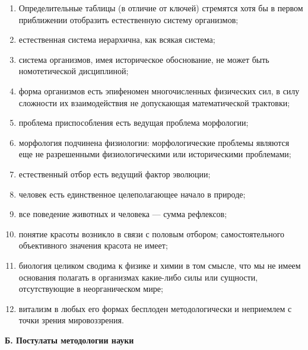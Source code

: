 \begin{enumerate}

  \item Определительные таблицы (в отличие от ключей) стремятся хотя
        бы в первом приближении отобразить естественную систему
        организмов;

  \item естественная система иерархична, как всякая система;

  \item система организмов, имея историческое обоснование, не может
        быть номотетической дисциплиной;

  \item форма организмов есть эпифеномен многочисленных физических
        сил, в силу сложности их взаимодействия не допускающая
        математической трактовки;

  \item проблема приспособления есть ведущая проблема морфологии;

  \item морфология подчинена физиологии: морфологические проблемы
        являются еще не разрешенными физиологическими или
        историческими проблемами;

  \item естественный отбор есть ведущий фактор эволюции;

  \item человек есть единственное целеполагающее начало в природе;

  \item все поведение животных и человека --- сумма рефлексов;

  \item понятие красоты возникло в связи с половым отбором;
        самостоятельного объективного значения красота не имеет;

  \item биология целиком сводима к физике и химии в том смысле, что мы
        не имеем основания полагать в организмах какие-либо силы или
        сущности, отсутствующие в неорганическом мире;

  \item витализм в любых его формах бесплоден методологически и
        неприемлем с точки зрения мировоззрения.

\end{enumerate}

\begin{center}
  \textbf{Б. Постулаты методологии науки}
\end{center}

